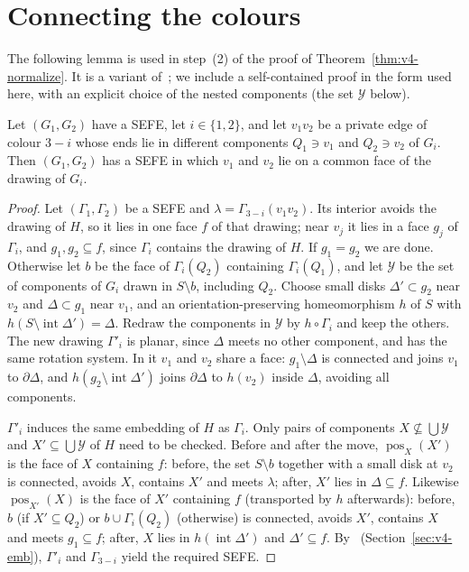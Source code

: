 \section{Connecting the colours}\label{sec:v4-app-connect}

The following lemma is used in step~(2) of the proof of
Theorem~\ref{thm:v4-normalize}. It is a variant of~\cite[Lemma~1]{BR15}; we
include a self-contained proof in the form used here, with an explicit
choice of the nested components (the set $\mathcal Y$ below).

\begin{lemma}\label{lem:v4-connect}
Let $(G_1,G_2)$ have a SEFE, let $i\in\{1,2\}$, and let $v_1v_2$ be a
private edge of colour $3-i$ whose ends lie in different components $Q_1\ni
v_1$ and $Q_2\ni v_2$ of $G_i$. Then $(G_1,G_2)$ has a SEFE in which $v_1$
and $v_2$ lie on a common face of the drawing of $G_i$.
\end{lemma}

\begin{proof}
Let $(\Gamma_1,\Gamma_2)$ be a SEFE and $\lambda=\Gamma_{3-i}(v_1v_2)$. Its
interior avoids the drawing of $H$, so it lies in one face $f$ of that
drawing; near $v_j$ it lies in a face $g_j$ of $\Gamma_i$, and
$g_1,g_2\subseteq f$, since $\Gamma_i$ contains the drawing of $H$. If
$g_1=g_2$ we are done. Otherwise let $b$ be the face of $\Gamma_i(Q_2)$
containing $\Gamma_i(Q_1)$, and let $\mathcal Y$ be the set of components of
$G_i$ drawn in $S\setminus b$, including $Q_2$. Choose small disks
$\Delta'\subset g_2$ near $v_2$ and $\Delta\subset g_1$ near $v_1$, and an
orientation-preserving homeomorphism $h$ of $S$ with
$h(S\setminus\operatorname{int}\Delta')=\Delta$. Redraw the components in
$\mathcal Y$ by $h\circ\Gamma_i$ and keep the others. The new drawing
$\Gamma'_i$ is planar, since $\Delta$ meets no other component, and has the
same rotation system. In it $v_1$ and $v_2$ share a face: $g_1\setminus\Delta$
is connected and joins $v_1$ to $\partial\Delta$, and
$h(g_2\setminus\operatorname{int}\Delta')$ joins $\partial\Delta$ to $h(v_2)$
inside $\Delta$, avoiding all components.

$\Gamma'_i$ induces the same embedding of $H$ as $\Gamma_i$. Only pairs of
components $X\not\subseteq\bigcup\mathcal Y$ and $X'\subseteq\bigcup\mathcal
Y$ of $H$ need to be checked. Before and after the move,
$\operatorname{pos}_X(X')$ is the face of $X$ containing $f$: before, the set
$S\setminus b$ together with a small disk at $v_2$ is connected, avoids $X$,
contains $X'$ and meets $\lambda$; after, $X'$ lies in $\Delta\subseteq f$.
Likewise $\operatorname{pos}_{X'}(X)$ is the face of $X'$ containing $f$
(transported by $h$ afterwards): before, $b$ (if $X'\subseteq Q_2$) or
$b\cup\Gamma_i(Q_2)$ (otherwise) is connected, avoids $X'$, contains $X$ and
meets $g_1\subseteq f$; after, $X$ lies in $h(\operatorname{int}\Delta')$ and
$\Delta'\subseteq f$. By~\cite[Theorem~4]{JS09}
(Section~\ref{sec:v4-emb}), $\Gamma'_i$ and $\Gamma_{3-i}$ yield the required
SEFE.
\end{proof}
